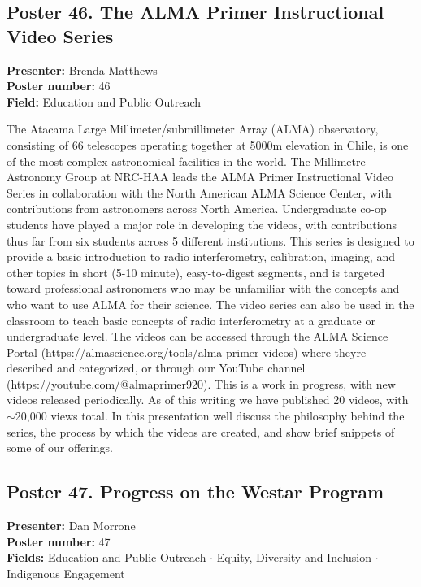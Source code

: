 \hypertarget{poster-abstract-talk-17}{}\label{poster-abstract-page-talk-17}
\subsection*{Poster 46. The ALMA Primer Instructional Video Series}
\textbf{Presenter:} Brenda Matthews\\
\textbf{Poster number:} 46\\
\textbf{Field:} Education and Public Outreach

The Atacama Large Millimeter/submillimeter Array (ALMA) observatory, consisting of 66 telescopes operating together at 5000m elevation in Chile, is one of the most complex astronomical facilities in the world. The Millimetre Astronomy Group at NRC-HAA leads the ALMA Primer Instructional Video Series in collaboration with the North American ALMA Science Center, with contributions from astronomers across North America. Undergraduate co-op students have played a major role in developing the videos, with contributions thus far from six students across 5 different institutions. This series is designed to provide a basic introduction to radio interferometry, calibration, imaging, and other topics in short (5-10 minute), easy-to-digest segments, and is targeted toward professional astronomers who may be unfamiliar with the concepts and who want to use ALMA for their science. The video series can also be used in the classroom to teach basic concepts of radio interferometry at a graduate or undergraduate level. The videos can be accessed through the ALMA Science Portal (https://almascience.org/tools/alma-primer-videos) where theyre described and categorized, or through our YouTube channel (https://youtube.com/@almaprimer920). This is a work in progress, with new videos released periodically. As of this writing we have published 20 videos, with $\sim$20,000 views total. In this presentation well discuss the philosophy behind the series, the process by which the videos are created, and show brief snippets of some of our offerings.

\hypertarget{poster-abstract-talk-210}{}\label{poster-abstract-page-talk-210}
\subsection*{Poster 47. Progress on the Westar Program}
\textbf{Presenter:} Dan Morrone\\
\textbf{Poster number:} 47\\
\textbf{Fields:} Education and Public Outreach $\cdot$ Equity, Diversity and Inclusion $\cdot$ Indigenous Engagement

